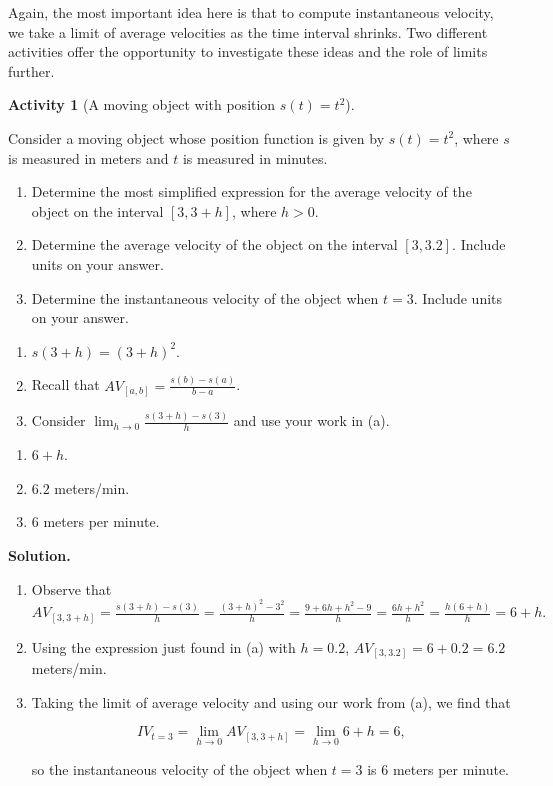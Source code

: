 \documentclass[10pt,]{book}
\theoremstyle{plain}
\theoremstyle{definition}
\theoremstyle{definition}
\theoremstyle{definition}
\theoremstyle{definition}
\newtheorem{activity}[project]{Activity}
\theoremstyle{definition}
\numberwithin{equation}{section}
\newcommand{\gt}{ > }
\begin{document}
  Again, the most important idea here is that to compute instantaneous velocity, we take a limit of average velocities as the time interval shrinks. Two different activities offer the opportunity to investigate these ideas and the role of limits further. 
\begin{activity}[A moving object with position \(s(t)=t^2\)]\label{act-1-2-2}

        Consider a moving object whose position function is given by \(s(t) = t^2\), where \(s\) is measured in meters and \(t\) is measured in minutes.
\leavevmode%
\begin{enumerate}[label=\alph*lpha]
\item\hypertarget{li-60}{}Determine the most simplified expression for the average velocity of the object on the interval \([3, 3+h]\), where \(h \gt 0\).%
\item\hypertarget{li-61}{}Determine the average velocity of the object on the interval \([3,3.2]\).  Include units on your answer.%
\item\hypertarget{li-62}{}Determine the instantaneous velocity of the object when \(t = 3\).  Include units on your answer.%
\end{enumerate}
\leavevmode%
\begin{enumerate}[label=\alph*lpha]
\item\hypertarget{li-63}{}\(s(3+h) = (3+h)^2\).%
\item\hypertarget{li-64}{}Recall that \(AV_{[a,b]} = \frac{s(b)-s(a)}{b-a}\).%
\item\hypertarget{li-65}{}Consider \(\lim_{h \to 0} \frac{s(3+h)-s(3)}{h}\) and use your work in (a).%
\end{enumerate}
\leavevmode%
\begin{enumerate}[label=\alph*lpha]
\item\hypertarget{li-66}{}\(6 + h.\)%
\item\hypertarget{li-67}{}\(6.2\) meters/min.%
\item\hypertarget{li-68}{}\(6\) meters per minute.%
\end{enumerate}
\par\medskip\noindent%
\textbf{Solution.}\quad \leavevmode%
\begin{enumerate}[label=\alph*lpha]
\item\hypertarget{li-69}{}Observe that \(AV_{[3, 3+h]} =  \frac{s(3+h)-s(3)}{h} = \frac{(3+h)^2 - 3^2}{h} = \frac{9 + 6h + h^2 - 9}{h} = \frac{6h + h^2}{h} = \frac{h(6 + h)}{h} = 6 + h.\)%
\item\hypertarget{li-70}{}Using the expression just found in (a) with \(h = 0.2\), \(AV_{[3,3.2]} = 6 + 0.2 = 6.2\) meters/min.%
\item\hypertarget{li-71}{}Taking the limit of average velocity and using our work from (a), we find that
  
              \begin{equation*}
              IV_{t = 3} = \lim_{h \to 0} AV_{[3, 3+h]} = \lim_{h \to 0} 6+h = 6,
              \end{equation*}
 
            so the instantaneous velocity of the object when \(t = 3\) is 6 meters per minute.%
\end{enumerate}
\end{activity}
\end{document}
